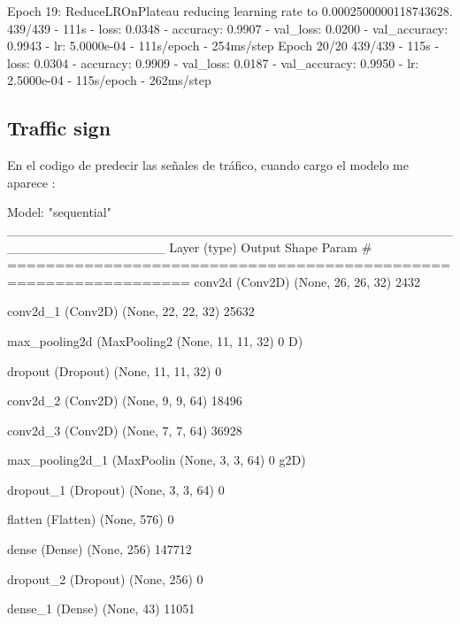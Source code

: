 \documentclass[11pt, a4paper]{article} %
\begin{document}
Epoch 19: ReduceLROnPlateau reducing learning rate to 0.0002500000118743628.
439/439 - 111s - loss: 0.0348 - accuracy: 0.9907 - val_loss: 0.0200 - val_accuracy: 0.9943 - lr: 5.0000e-04 - 111s/epoch - 254ms/step
Epoch 20/20
439/439 - 115s - loss: 0.0304 - accuracy: 0.9909 - val_loss: 0.0187 - val_accuracy: 0.9950 - lr: 2.5000e-04 - 115s/epoch - 262ms/step

\subsection{Traffic sign}

En el codigo de predecir las señales de tráfico, cuando cargo el modelo me aparece :

Model: "sequential"
_________________________________________________________________
 Layer (type)                Output Shape              Param #   
=================================================================
 conv2d (Conv2D)             (None, 26, 26, 32)        2432      

 conv2d_1 (Conv2D)           (None, 22, 22, 32)        25632

 max_pooling2d (MaxPooling2  (None, 11, 11, 32)        0
 D)

 dropout (Dropout)           (None, 11, 11, 32)        0

 conv2d_2 (Conv2D)           (None, 9, 9, 64)          18496

 conv2d_3 (Conv2D)           (None, 7, 7, 64)          36928

 max_pooling2d_1 (MaxPoolin  (None, 3, 3, 64)          0
 g2D)

 dropout_1 (Dropout)         (None, 3, 3, 64)          0

 flatten (Flatten)           (None, 576)               0

 dense (Dense)               (None, 256)               147712

 dropout_2 (Dropout)         (None, 256)               0

 dense_1 (Dense)             (None, 43)                11051
\end{document}
